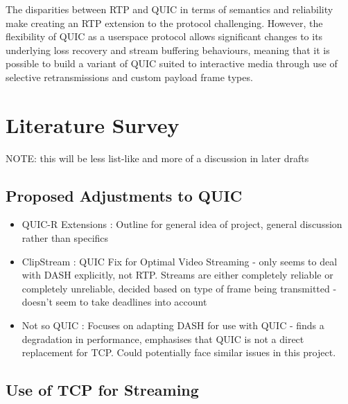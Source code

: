 \documentclass{mprop}
\begin{document}
The disparities between RTP and QUIC in terms of semantics and reliability make creating an RTP extension to the protocol challenging. However, the flexibility of QUIC as a userspace protocol allows significant changes to its underlying loss recovery and stream buffering behaviours, meaning that it is possible to build a variant of QUIC suited to interactive media through use of selective retransmissions and custom payload frame types.


\newpage

\section{Literature Survey}


NOTE: this will be less list-like and more of a discussion in later drafts

\subsection{Proposed Adjustments to QUIC}

\begin{itemize}
	\item QUIC-R Extensions \cite{Perkins}: Outline for general idea of project, general discussion 
	rather than specifics
  
  \item ClipStream \cite{Palmer2018}: QUIC Fix for Optimal Video Streaming - only seems to deal 
  with DASH explicitly, not RTP. Streams are either completely reliable or completely unreliable, 
  decided based on type of frame being transmitted - doesn't seem to take deadlines into account

  \item Not so QUIC \cite{Bhat2017}: Focuses on adapting DASH for use with QUIC - finds a 
  degradation in performance, emphasises that QUIC is not a direct replacement for TCP. Could 
  potentially face similar issues in this project.
\end{itemize}

\subsection{Use of TCP for Streaming}
\end{document}
